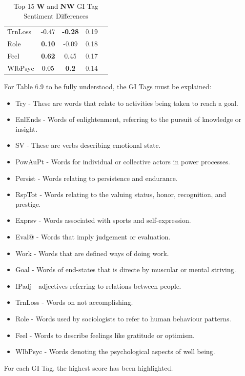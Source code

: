 \documentclass[oneside,12pt]{Classes/RoboticsLaTeX}
\begin{document}
\begin{table}[!h]
\begin{adjustbox}{center,max width=\linewidth}
\begin{tabular}{l|cccc}
      TrnLoss         & -0.47             & \textbf{-0.28}           & 0.19                  \\
      Role            & \textbf{0.10}              & -0.09           & 0.18                  \\
      Feel            & \textbf{0.62}              & 0.45            & 0.17                  \\
      WlbPsyc         & 0.05              & \textbf{0.2}             & 0.14                  \\
    \bottomrule
    \end{tabular}
  \end{adjustbox}
  \caption{Top 15 \textbf{W} and \textbf{NW} GI Tag Sentiment Differences}
  \label{tab:sentiment_a}
\end{table}
For Table 6.9 to be fully understood, the GI Tags must be explained:
\begin{itemize}
  \item Try - These are words that relate to activities being taken to reach a goal.
  \item EnlEnds - Words of enlightenment, referring to the pursuit of knowledge or insight.
  \item SV - These are verbs describing emotional state.
  \item PowAuPt - Words for individual or collective actors in power processes.
  \item Persist - Words relating to persistence and endurance.
  \item RspTot - Words relating to the valuing status, honor, recognition, and prestige.
  \item Exprsv - Words associated with sports and self-expression.
  \item Eval@ - Words that imply judgement or evaluation.
  \item Work - Words that are defined ways of doing work.
  \item Goal - Words of end-states that is directe by muscular or mental striving.
  \item IPadj - adjectives referring to relations between people.
  \item TrnLoss - Words on not accomplishing.
  \item Role - Words used by sociologists to refer to human behaviour patterns.
  \item Feel - Words to describe feelings like gratitude or optimism.
  \item WlbPsyc - Words denoting the psychological aspects of well being.
\end{itemize}
For each GI Tag, the highest score has been highlighted.
\end{document}
